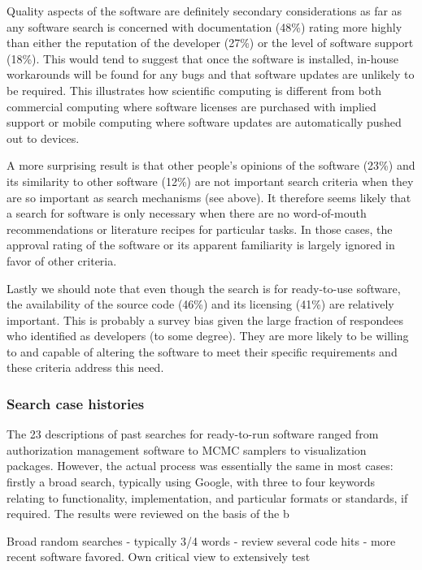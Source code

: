 \documentclass{casicswhitepaper}
\begin{document}
Quality aspects of the software are definitely secondary considerations as far as any software search is concerned with documentation (48\%) rating more highly than either the reputation of the developer (27\%) or the level of software support (18\%). This would tend to suggest that once the software is installed, in-house workarounds will be found for any bugs and that software updates are unlikely to be required. This illustrates how scientific computing is different from both commercial computing where software licenses are purchased with implied support or mobile computing where software updates are automatically pushed out to devices. 

A more surprising result is that other people's opinions of the software (23\%) and its similarity to other software (12\%) are not important search criteria when they are so important as search mechanisms (see above). It therefore seems likely that a search for software is only necessary when there are no word-of-mouth recommendations or literature recipes for particular tasks. In those cases, the approval rating of the software or its apparent familiarity is largely ignored in favor of other criteria.

Lastly we should note that even though the search is for ready-to-use software, the availability of the source code (46\%) and its licensing (41\%) are relatively important. This is probably a survey bias given the large fraction of respondees who identified as developers (to some degree). They are more likely to be willing to and capable of altering the software to meet their specific requirements and these criteria address this need.

\subsubsection{Search case histories}

The 23 descriptions of past searches for ready-to-run software ranged from authorization management software to MCMC samplers to visualization packages. However, the actual process was essentially the same in most cases: firstly a broad search, typically using Google, with three to four keywords relating to functionality, implementation, and particular formats or standards, if required. 
The results were reviewed on the basis of the b

Broad random searches - typically 3/4 words - review several code hits - more recent software favored. Own critical view to extensively test
\end{document}
